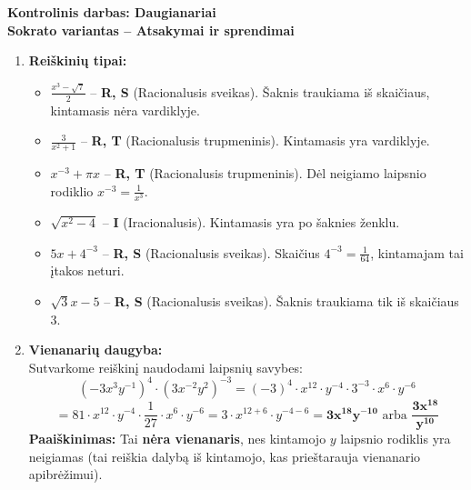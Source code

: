 \documentclass[12pt,a4paper]{article}
\begin{document}
\begin{center}
    {\Large \textbf{Kontrolinis darbas: Daugianariai}}\\[0.3cm]
    {\large \textbf{Sokrato variantas -- Atsakymai ir sprendimai}}
\end{center}
\vspace{0.5cm}

\begin{enumerate}
    \item \textbf{Reiškinių tipai:}
    \begin{itemize}
        \item[a)] $\displaystyle \frac{x^3 - \sqrt{7}}{2}$ -- \textbf{R, S} (Racionalusis sveikas). Šaknis traukiama iš skaičiaus, kintamasis nėra vardiklyje.
        \item[b)] $\displaystyle \frac{3}{x^2 + 1}$ -- \textbf{R, T} (Racionalusis trupmeninis). Kintamasis yra vardiklyje.
        \item[c)] $\displaystyle x^{-3} + \pi x$ -- \textbf{R, T} (Racionalusis trupmeninis). Dėl neigiamo laipsnio rodiklio $x^{-3} = \frac{1}{x^3}$.
        \item[d)] $\displaystyle \sqrt{x^2 - 4}$ -- \textbf{I} (Iracionalusis). Kintamasis yra po šaknies ženklu.
        \item[e)] $\displaystyle 5x + 4^{-3}$ -- \textbf{R, S} (Racionalusis sveikas). Skaičius $4^{-3} = \frac{1}{64}$, kintamajam tai įtakos neturi.
        \item[f)] $\displaystyle \sqrt{3}x - 5$ -- \textbf{R, S} (Racionalusis sveikas). Šaknis traukiama tik iš skaičiaus $3$.
    \end{itemize}

    \vspace{0.3cm}
    \item \textbf{Vienanarių daugyba:} \\
    Sutvarkome reiškinį naudodami laipsnių savybes:
    $$ \left( -3x^3y^{-1} \right)^4 \cdot \left( 3x^{-2}y^2 \right)^{-3} = (-3)^4 \cdot x^{12} \cdot y^{-4} \cdot 3^{-3} \cdot x^6 \cdot y^{-6} $$
    $$ = 81 \cdot x^{12} \cdot y^{-4} \cdot \frac{1}{27} \cdot x^6 \cdot y^{-6} = 3 \cdot x^{12+6} \cdot y^{-4-6} = \mathbf{3x^{18}y^{-10}} \text{ arba } \mathbf{\frac{3x^{18}}{y^{10}}} $$
    \textbf{Paaiškinimas:} Tai \textbf{nėra vienanaris}, nes kintamojo $y$ laipsnio rodiklis yra neigiamas (tai reiškia dalybą iš kintamojo, kas prieštarauja vienanario apibrėžimui).


\end{enumerate}
\end{document}
